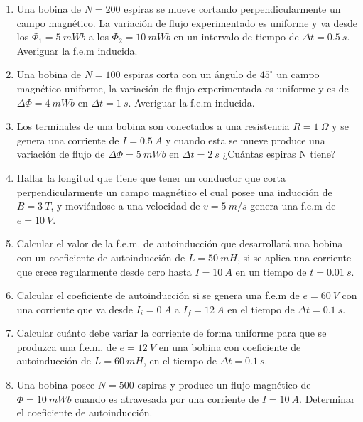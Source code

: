 \documentclass[../main]{subfiles}
\begin{document}
\begin{enumerate}
  \item Una bobina de $N=200$ espiras se mueve cortando perpendicularmente un campo magn\'etico. La variaci\'on de flujo experimentado es uniforme y va desde los $\Phi_1=\qty{5}{mWb}$ a los $\Phi_2=\qty{10}{mWb}$ en un intervalo de tiempo de $\Delta t = \qty{0,5}{s}$. Averiguar la f.e.m inducida.

  \item Una bobina de $N=100$ espiras corta con un \'angulo de $45^\circ$ un campo magn\'etico uniforme, la variaci\'on de flujo experimentada es uniforme y es de $\Delta \Phi = \qty{4}{mWb}$ en $\Delta t = \qty{1}{s}$. Averiguar la f.e.m inducida.

  \item Los terminales de una bobina son conectados a una resistencia $R=\qty{1}{\Omega}$ y se genera una corriente de $I=\qty{0,5}{A}$ y cuando esta se mueve produce una variaci\'on de flujo de $\Delta \Phi =\qty{5}{mWb}$ en $\Delta t = \qty{2}{s}$ ¿Cu\'antas espiras N tiene?

  \item Hallar la longitud que tiene que tener un conductor que corta perpendicularmente un campo magn\'etico el cual posee una inducci\'on de $B=\qty{3}{T}$, y movi\'endose a una velocidad de $v=\qty{5}{m/s}$ genera una f.e.m de $e=\qty{10}{V}$.

  \item Calcular el valor de la f.e.m. de autoinducci\'on que desarrollar\'a una bobina con un coeficiente de autoinducci\'on de $L=\qty{50}{mH}$, si se aplica una corriente que crece regularmente desde cero hasta $I=\qty{10}{A}$ en un tiempo de $t=\qty{0,01}{s}$.

  \item Calcular el coeficiente de autoinducci\'on si se genera una f.e.m de $e=\qty{60}{V}$ con una corriente que va desde $I_i=\qty{0}{A}$ a $I_f=\qty{12}{A}$ en el tiempo de $\Delta t=\qty{0,1}{s}$.

  \item Calcular cu\'anto debe variar la corriente de forma uniforme para que se produzca una f.e.m. de $e=\qty{12}{V}$ en una bobina con coeficiente de autoinducci\'on de $L=\qty{60}{mH}$, en el tiempo de $\Delta t=\qty{0,1}{s}$.

  \item Una bobina posee $N=500$ espiras y produce un flujo magn\'etico de $\Phi=\qty{10}{mWb}$ cuando es atravesada por una corriente de $I=\qty{10}{A}$. Determinar el coeficiente de autoinducci\'on.


\end{enumerate}
\end{document}
